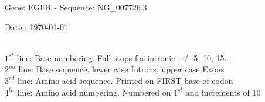 \documentclass{article}
\begin{document}
\renewcommand{\footrulewidth}{1pt}
\renewcommand{\headrulewidth}{0pt}
\begin{center}
\begin{large}
 Gene: EGFR - Sequence: NG\_007726.3
 
 Date : \today\\\\
\end{large}
\end{center}
$1^{st}$ line: Base numbering. Full stops for intronic +/- 5, 10, 15...\\
$2^{nd}$ line: Base sequence. lower case Introns, upper case Exons\\
$3^{rd}$ line: Amino acid sequence. Printed on FIRST base of codon\\
$4^{th}$ line: Amino acid numbering. Numbered on $1^{st}$ and increments of 10\\
\end{document}

